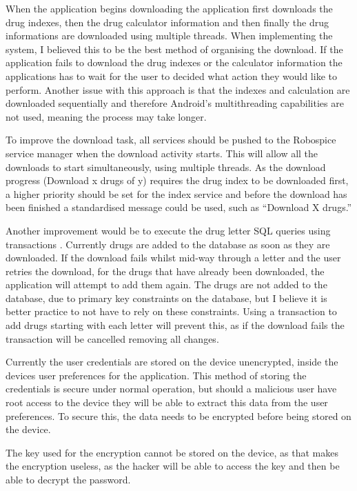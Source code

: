 When the application begins downloading the application first downloads the drug indexes, then the drug calculator information and then finally the drug informations are downloaded using multiple threads. When implementing the system, I believed this to be the best method of organising the download. If the application fails to download the drug indexes or the calculator information the applications has to wait for the user to decided what action they would like to perform. Another issue with this approach is that the indexes and calculation are downloaded sequentially and therefore Android's multithreading capabilities are not used, meaning the process may take longer.

To improve the download task, all services should be pushed to the Robospice service manager when the download activity starts. This will allow all the downloads to start simultaneously, using multiple threads. As the download progress (Download x drugs of y) requires the drug index to be downloaded first, a higher priority should be set for the index service and before the download has been finished a standardised message could be used, such as “Download X drugs.”

Another improvement would be to execute the drug letter SQL queries using transactions \cite{sqlite}. Currently drugs are added to the database as soon as they are downloaded. If the download fails whilst mid-way through a letter and the user retries the download, for the drugs that have already been downloaded, the application will attempt to add them again. The drugs are not added to the database, due to primary key constraints on the database, but I believe it is better practice to not have to rely on these constraints. Using a transaction to add drugs starting with each letter will prevent this, as if the download fails the transaction will be cancelled removing all changes.

Currently the user credentials are stored on the device unencrypted, inside the devices user preferences \cite{shared_pref} for the application. This method of storing the credentials is secure under normal operation, but should a malicious user have root access to the device they will be able to extract this data from the user preferences. To secure this, the data needs to be encrypted before being stored on the device.

The key used for the encryption cannot be stored on the device, as that makes the encryption useless, as the hacker will be able to access the key and then be able to decrypt the password. 


